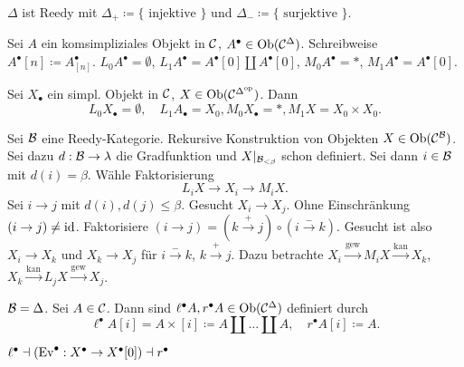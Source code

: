 \documentclass{cheat-sheet}
\begin{document}
\begin{bsp}
  $\Delta$ ist Reedy mit $\Delta_{+} \coloneqq \{\text{ injektive }\}$ und $\Delta_{-} \coloneqq \{\text{ surjektive }\}$.
\end{bsp}

\begin{bsp}
  Sei $A$ ein komsimpliziales Objekt in $\mathcal{C}$, \dh{} $A^\bullet \in \operatorname{Ob}(\mathcal{C}^\Delta)$.
  Schreibweise $A^\bullet [n] \coloneqq A^\bullet_{[n]}$.
  $L_0 A^\bullet = \emptyset$, $L_1 A^\bullet = A^\bullet[0] \amalg A^\bullet [0]$, $M_0 A^\bullet = *$, $M_1 A^\bullet = A^\bullet [0]$.
\end{bsp}

\begin{bsp}
  Sei $X_\bullet$ ein simpl. Objekt in $\mathcal{C}$, \dh{} $X \in \operatorname{Ob}(\mathcal{C}^{\Delta^{\mathrm{op}}})$. Dann
  \[ L_0 X_\bullet = \emptyset, \quad L_1 A_\bullet = X_0, M_0 X_\bullet = *, M_1 X= X_0 \times X_0. \]
\end{bsp}

\begin{bem}
  Sei $\mathcal{B}$ eine Reedy-Kategorie.
  Rekursive Konstruktion von Objekten $X \in \operatorname{Ob}(\mathcal{C}^{\mathcal{B}})$.
  Sei dazu $d : \mathcal{B} \to \lambda$ die Gradfunktion und $X|_{\mathcal{B}_{< \beta}}$ schon definiert.
  Sei dann $i \in \mathcal{B}$ mit $d(i) = \beta$.
  Wähle Faktorisierung
  \[ L_i X \to X_i \to M_i X. \]
  Sei $i \to j$ mit $d(i), d(j) \leq \beta$.
  Gesucht $X_i \to X_j$.
  Ohne Einschränkung $(i \to j) \neq \operatorname{id}$.
  Faktorisiere $(i \to j) = (k \xrightarrow{{+}} j) \circ (i \xrightarrow{{-}} k)$.
  Gesucht ist also $X_i \to X_k$ und $X_k \to X_j$ für $i \xrightarrow{{-}} k$, $k \xrightarrow{{+}} j$.
  Dazu betrachte $X_i \xrightarrow{\text{gew}} M_i X \xrightarrow{\text{kan}} X_k$, $X_k \xrightarrow{\text{kan}} L_j X \xrightarrow{\text{gew}} X_j$.
\end{bem}

\iffalse
\begin{bsp}
  $\Bat = \Delta$. Sei $A \in \Cat$. Ziel: Konstruktion $X^\bullet \in \Cat^{\Delta}$.
\end{bsp}
\fi

\begin{defn}
  $\Bat = \Delta$. Sei $A \in \Cat$.
  Dann sind $\ell^\bullet A, r^\bullet A \in \operatorname{Ob}(\mathcal{C}^\Delta)$ definiert durch
  \[
    \ell^\bullet A [i] = A \times [i] \coloneqq A \amalg \ldots \amalg A, \quad
    r^\bullet A [i] \coloneqq A.
  \]
\end{defn}

\begin{bem}
  $\ell^\bullet \dashv (\text{Ev}^\bullet : X^\bullet \to X^\bullet [0]) \dashv r^\bullet$
\end{bem}
\end{document}
